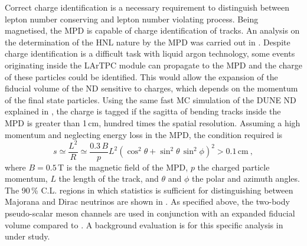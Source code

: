 Correct charge identification is a necessary requirement to distinguish between %
lepton number conserving and lepton number violating process.
Being magnetised, the MPD is capable of charge identification of tracks.
An analysis on the determination of the HNL nature by the MPD was carried out in .
Despite charge identification is a difficult task with liquid argon technology, %
some events originating inside the LArTPC module can propagate to the MPD and the charge of these particles could be identified.
This would allow the expansion of the fiducial volume of the ND sensitive to charges, which depends on the momentum of the final state particles.
Using the same fast MC simulation of the DUNE ND explained in , %
the charge is tagged if the sagitta of bending tracks inside the MPD is greater than 1\,cm, %
hundred times the spatial resolution.
Assuming a high momentum and neglecting energy loss in the MPD, the condition required is 
\begin{equation}
	s \simeq \frac{L^2}{R} \simeq \frac{0.3\,B}{p} L^2 %
	(\cos^2\theta + \sin^2\theta\, \sin^2\phi)^2 > 0.1\,\text{cm}\ ,
\end{equation}
where $B = 0.5$\,T is the magnetic field of the MPD, $p$ the charged particle momentum, %
$L$ the length of the track, and $\theta$ and $\phi$ the polar and azimuth angles.
The 90\,\% C.L. regions in which statistics is sufficient for distinguishing between Majorana and Dirac neutrinos %
are shown in .
As specified above, the two-body pseudo-scalar meson channels are used in conjunction with an expanded fiducial volume %
compared to .
A background evaluation is for this specific analysis in under study.
